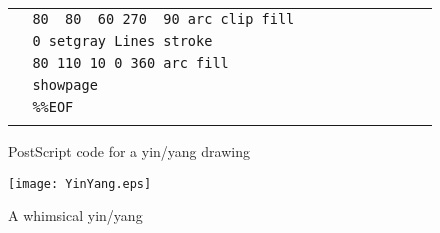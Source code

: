 \begin{figure}[hbt]
\begin{center}
\begin{tabular}{|l|}
\verb+  80  80  60 270  90 arc clip fill                  +\\ 
\verb+  0 setgray Lines stroke                            +\\ 
\verb+  80 110 10 0 360 arc fill                          +\\  
\verb+  showpage                                          +\\ 
\verb+  %%EOF                                             +\\ 
  \\   \hline                      
\end{tabular}
\end{center}          
\caption{PostScript code for a yin/yang drawing }
\label{YinYangCode}
\end{figure}


\clearpage
  
%
\begin{figure}[htb] 
\begin{center}
\texttt{[image: YinYang.eps]}
\end{center}
\caption{A whimsical yin/yang}
\label{YinYangDrawing}
\end{figure}
%


\clearpage
\endinput

